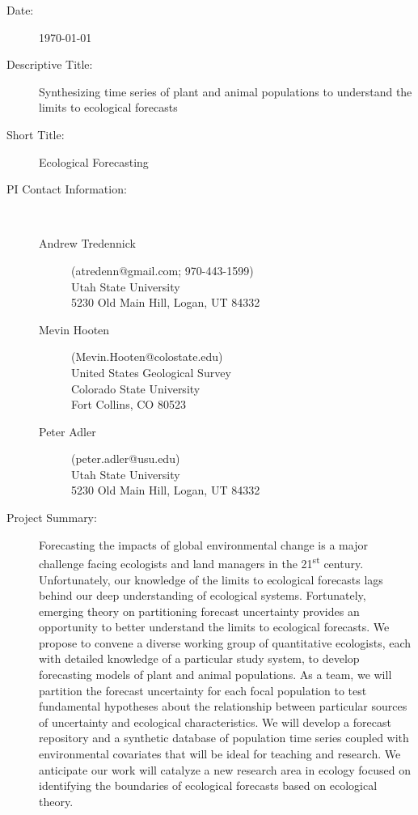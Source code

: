 \documentclass[12pt,]{article}
\title{}
\author{}
\date{}
\begin{document}

\begin{description}
\item[Date:] \today
\item[Descriptive Title:] Synthesizing time series of plant and animal populations to understand the limits to ecological forecasts
\item[Short Title:] Ecological Forecasting
\item[PI Contact Information:] ~\\
\vspace{-1.5em}
\begin{description}
 \item[\textcolor{mycol}{Andrew Tredennick}] (atredenn@gmail.com; 970-443-1599) \\ Utah State University \\ 5230 Old Main Hill, Logan, UT 84332
 \item[\textcolor{mycol}{Mevin Hooten}] (Mevin.Hooten@colostate.edu) \\ United States Geological Survey \\ Colorado State University \\ Fort Collins, CO 80523
 \item[\textcolor{mycol}{Peter Adler}] (peter.adler@usu.edu) \\ Utah State University \\ 5230 Old Main Hill, Logan, UT 84332
\end{description}
\item[Project Summary:] Forecasting the impacts of global environmental change is a major challenge facing ecologists and land managers in the 21\textsuperscript{st} century. Unfortunately, our knowledge of the limits to ecological forecasts lags behind our deep understanding of ecological systems. Fortunately, emerging theory on partitioning forecast uncertainty provides an opportunity to better understand the limits to ecological forecasts. We propose to convene a diverse working group of quantitative ecologists, each with detailed knowledge of a particular study system, to develop forecasting models of plant and animal populations. As a team, we will partition the forecast uncertainty for each focal population to test fundamental hypotheses about the relationship between particular sources of uncertainty and ecological characteristics. We will develop a forecast repository and a synthetic database of population time series coupled with environmental covariates that will be ideal for teaching and research. We anticipate our work will catalyze a new research area in ecology focused on identifying the boundaries of ecological forecasts based on ecological theory. 

\end{description}
\end{document}
